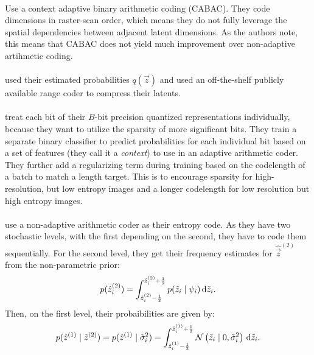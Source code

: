 \paragraph{\cite{balle2016end}} Use a context adaptive binary arithmetic coding (CABAC).
  They code dimensions in raster-scan order, which means they do not fully leverage the
  spatial dependencies between adjacent latent dimensions.
  As the authors note, this means that CABAC does not yield much improvement
  over non-adaptive artihmetic coding. 

\paragraph{\cite{theis2017lossy}} used their estimated probabilities $q(\vec{z})$ and
  used an off-the-shelf publicly available range coder to compress their latents.

\paragraph{\cite{rippel2017real}} treat each bit of their $B$-bit precision quantized
  representations individually, because they want to utilize the sparsity of
  more significant bits. They train a separate binary classifier to predict
  probabilities for each individual bit based on a set of features (they call
  it a \textit{context}) to use in an adaptive arithmetic coder. They further
  add a regularizing term during training based on the codelength of a batch to
  match a length target. This is to encourage sparsity for high-resolution, but
  low entropy images and a longer codelength for low resolution but high entropy
  images.

\paragraph{\cite{balle2018variational}} use a non-adaptive arithmetic coder as their
  entropy code. As they have two stochastic levels, with the
  first depending on the second, they have to code them sequentially. For the
  second level, they get their frequency estimates for $\hat{\vec{z}}^{(2)}$
  from the non-parametric prior:
  \[
    p(\hat{z}^{(2)}_i) =
    \int_{\hat{z}^{(2)}_i-\frac{1}{2}}^{\hat{z}^{(2)}_i+\frac{1}{2}}p(\tilde{z}_i \mid \psi_i) \,\text{d} \tilde{z}_i.
  \]
  Then, on the first level, their probaibilities are given by:
  \[
    p(\hat{z}^{(1)} \mid \tilde{z}^{(2)}) = p(\hat{z}^{(1)} \mid
    \tilde{\sigma}^2_i) = 
    \int_{\hat{z}^{(1)}_i-\frac{1}{2}}^{\hat{z}^{(1)}_i + \frac{1}{2}}\mathcal{N}\left( \tilde{z}_i \mid 0, \tilde{\sigma}^2_i \right) \,\text{d} \tilde{z}_i.
  \]

